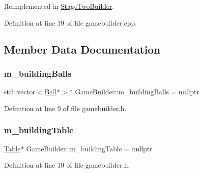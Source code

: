 Reimplemented in \mbox{\hyperlink{class_stage_two_builder_ac40c00c49b18b7c4f83f4474a8cd9c73}{Stage\+Two\+Builder}}.



Definition at line 19 of file gamebuilder.\+cpp.



\subsection{Member Data Documentation}
\mbox{\label{class_game_builder_a00bf40f2a9c4c72ff8e9bc94201bb681}} 
\subsubsection{\texorpdfstring{m\+\_\+building\+Balls}{m\_buildingBalls}}
{\footnotesize\ttfamily std\+::vector$<$\mbox{\hyperlink{class_ball}{Ball}}$\ast$$>$$\ast$ Game\+Builder\+::m\+\_\+building\+Balls = nullptr\hspace{0.3cm}{\ttfamily [protected]}}



Definition at line 9 of file gamebuilder.\+h.

\mbox{\label{class_game_builder_a0fe16583df85f0360cfe9b06a7ea3aee}} 
\subsubsection{\texorpdfstring{m\+\_\+building\+Table}{m\_buildingTable}}
{\footnotesize\ttfamily \mbox{\hyperlink{class_table}{Table}}$\ast$ Game\+Builder\+::m\+\_\+building\+Table = nullptr\hspace{0.3cm}{\ttfamily [protected]}}



Definition at line 10 of file gamebuilder.\+h.

\mbox{\label{class_game_builder_a2b8da37dc88d521fc01841a2c308508f}} 
